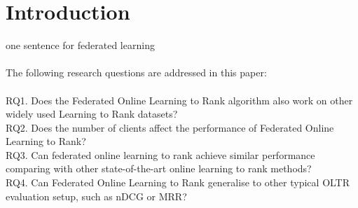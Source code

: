 \section{Introduction}

one sentence for federated learning\\
\\
The following research questions are addressed in this paper:\\
\\
RQ1. Does the Federated Online Learning to Rank algorithm also work on other widely used Learning to Rank datasets?\\
RQ2. Does the number of clients affect the performance of Federated Online Learning to Rank?\\
RQ3. Can federated online learning to rank achieve similar performance comparing with other state-of-the-art online learning to rank methods?\\
RQ4. Can Federated Online Learning to Rank generalise to other typical OLTR evaluation setup, such as nDCG or MRR?\\
